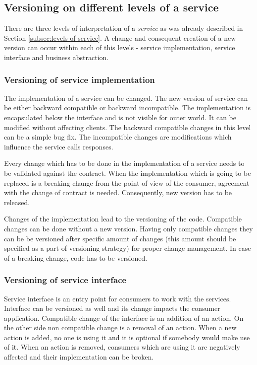 \subsection{Versioning on different levels of a service}
There are three levels of interpretation of a \emph{service} as was already described in Section \ref{subsec:levels-of-service}. A change and consequent creation of a new version can occur within each of this levels - service implementation, service interface and business abstraction.

\subsubsection{Versioning of service implementation}
The implementation of a service can be changed. The new version of service can be either backward compatible or backward incompatible. The implementation is encapsulated below the interface and is not visible for outer world. It can be modified without affecting clients. The backward compatible changes in this level can be a simple bug fix. The incompatible changes are modifications which influence the service calls responses.

Every change which has to be done in the implementation of a service needs to be validated against the contract. When the implementation which is going to be replaced is a breaking change from the point of view of the consumer, agreement with the change of contract is needed. Consequently, new version has to be released.

Changes of the implementation lead to the versioning of the code. Compatible changes can be done without a new version. Having only compatible changes they can be be versioned after specific amount of changes (this amount should be specified as a part of versioning strategy) for proper change management. In case of a breaking change, code has to be versioned.

\subsubsection{Versioning of service interface}
Service interface is an entry point for consumers to work with the services. Interface can be versioned as well and its change impacts the consumer application. Compatible change of the interface is an addition of an action. On the other side non compatible change is a removal of an action. When a new action is added, no one is using it and it is optional if somebody would make use of it. When an action is removed, consumers which are using it are negatively affected and their implementation can be broken.

